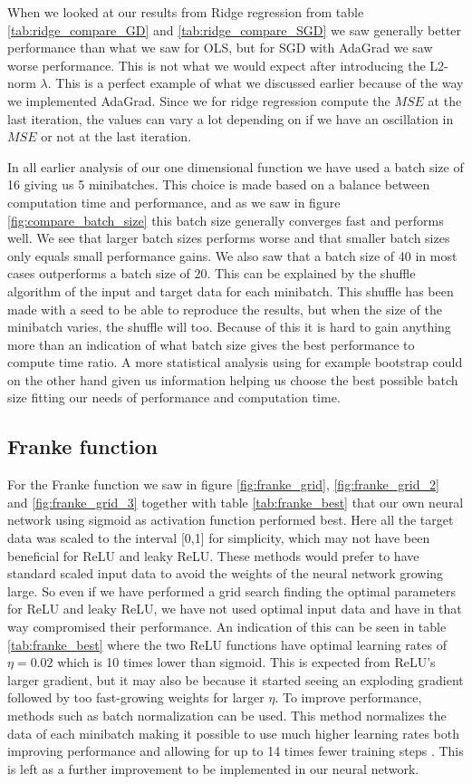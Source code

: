 \documentclass[11pt]{article}
\begin{document}
When we looked at our results from Ridge regression from table \ref{tab:ridge_compare_GD} and \ref{tab:ridge_compare_SGD} we saw generally better performance than what we saw for OLS, but for SGD with AdaGrad we saw worse performance. This is not what we would expect after introducing the L2-norm $\lambda$. This is a perfect example of what we discussed earlier because of the way we implemented AdaGrad. Since we for ridge regression compute the $MSE$ at the last iteration, the values can vary a lot depending on if we have an oscillation in $MSE$ or not at the last iteration.


In all earlier analysis of our one dimensional function we have used a batch size of 16 giving us 5 minibatches. This choice is made based on a balance between computation time and performance, and as we saw in figure \ref{fig:compare_batch_size} this batch size generally converges fast and performs well. We see that larger batch sizes performs worse and that smaller batch sizes only equals small performance gains. We also saw that a batch size of 40 in most cases outperforms a batch size of 20. This can be explained by the shuffle algorithm of the input and target data for each minibatch. This shuffle has been made with a seed to be able to reproduce the results, but when the size of the minibatch varies, the shuffle will too. Because of this it is hard to gain anything more than an indication of what batch size gives the best performance to compute time ratio. A more statistical analysis using for example bootstrap could on the other hand given us information helping us choose the best possible batch size fitting our needs of performance and computation time.

\subsection{Franke function}
For the Franke function we saw in figure \ref{fig:franke_grid}, \ref{fig:franke_grid_2} and \ref{fig:franke_grid_3} together with table \ref{tab:franke_best} that our own neural network using sigmoid as activation function performed best. Here all the target data was scaled to the interval [0,1] for simplicity, which may not have been beneficial for ReLU and leaky ReLU. These methods would prefer to have standard scaled input data \cite{deeplearning} to avoid the weights of the neural network growing large. So even if we have performed a grid search finding the optimal parameters for ReLU and leaky ReLU, we have not used optimal input data and have in that way compromised their performance. An indication of this can be seen in table \ref{tab:franke_best} where the two ReLU functions have optimal learning rates of $\eta=0.02$ which is 10 times lower than sigmoid. This is expected from ReLU's larger gradient, but it may also be because it started seeing an exploding gradient followed by too fast-growing weights for larger $\eta$. To improve performance, methods such as batch normalization can be used. This method normalizes the data of each minibatch making it possible to use much higher learning rates both improving performance and allowing for up to 14 times fewer training steps \cite{batchnormalization}. This is left as a further improvement to be implemented in our neural network.
\end{document}
